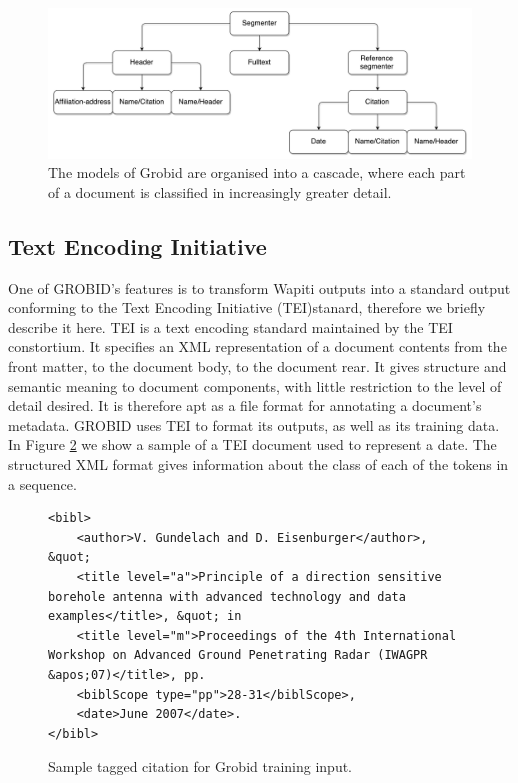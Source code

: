 \begin{figure}[!ht]
\center
\includegraphics[width=\textwidth]{Figures/cascade.pdf}
\caption{The models of Grobid are organised into a cascade, where each part of a document is classified in increasingly greater detail.}
\label{fig:cascade}
\end{figure}

\subsection{Text Encoding Initiative}

One of GROBID's features is to transform Wapiti outputs into a standard output conforming to the Text Encoding Initiative (TEI)stanard, therefore we briefly describe it here. TEI is a text encoding standard maintained by the TEI constortium. It specifies an XML representation of a document contents from the front matter, to the document body, to the document rear. It gives structure and semantic meaning to document components, with little restriction to the level of detail desired. It is therefore apt as a file format for annotating a document's metadata. GROBID uses TEI to format its outputs, as well as its training data. In Figure \ref{fig:teicitation} we show a sample of a TEI document used to represent a date. The structured XML format gives information about the class of each of the tokens in a sequence.

\begin{figure}
\lstset{language=XML}
\begin{lstlisting}
<bibl>
    <author>V. Gundelach and D. Eisenburger</author>, &quot; 
    <title level="a">Principle of a direction sensitive borehole antenna with advanced technology and data examples</title>, &quot; in 	
    <title level="m">Proceedings of the 4th International Workshop on Advanced Ground Penetrating Radar (IWAGPR &apos;07)</title>, pp. 
    <biblScope type="pp">28-31</biblScope>, 
    <date>June 2007</date>.
</bibl>
\end{lstlisting}
\label{fig:teicitation}
\caption{Sample tagged citation for Grobid training input.}
\end{figure}

